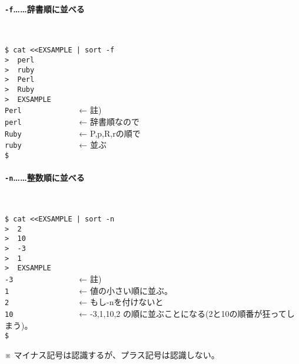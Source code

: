 \paragraph*{\verb|-f|……辞書順に並べる}　\\
\begin{screen}
	\verb!$ cat <<EXSAMPLE | sort -f! \return \\
	\verb!>  perl! \return \\
	\verb!>  ruby! \return \\
	\verb!>  Perl! \return \\
	\verb!>  Ruby! \return \\
	\verb!>  EXSAMPLE! \return \\
	\verb!Perl             !  ← 註) \\
	\verb!perl             !  ← 辞書順なので \\
	\verb!Ruby             !  ← P,p,R,rの順で \\
	\verb!ruby             !  ← 並ぶ \\
	\verb!$ !
\end{screen}

\paragraph*{\verb|-n|……整数順に並べる}　\\
\begin{screen}
	\verb!$ cat <<EXSAMPLE | sort -n! \return \\
	\verb!>  2! \return \\
	\verb!>  10! \return \\
	\verb!>  -3! \return \\
	\verb!>  1! \return \\
	\verb!>  EXSAMPLE! \return \\
	\verb!-3               !  ← 註) \\
	\verb!1                !  ← 値の小さい順に並ぶ。 \\
	\verb!2                !  ← もし-nを付けないと \\
	\verb!10               !  ← -3,1,10,2 の順に並ぶことになる(2と10の順番が狂ってしまう)。 \\
	\verb!$ !
\end{screen}

\noindent
※ マイナス記号は認識するが、プラス記号は認識しない。

